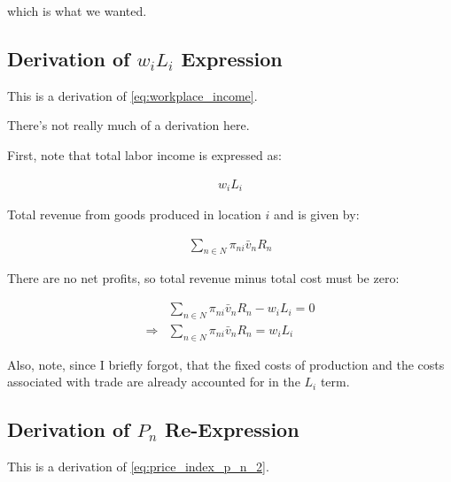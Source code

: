 \documentclass[10pt]{article}
\begin{document}
which is what we wanted.


\subsection{Derivation of $w_i L_i$ Expression}
\label{sec:workplace_income}

This is a derivation of \eqref{eq:workplace_income}.

There's not really much of a derivation here. 

First, note that total labor income is expressed as:

\begin{align}
    w_i L_i
\end{align}

Total revenue from goods produced in location $i$ and is given by:

\begin{align}
    \sum_{n \in N} \pi_{n i} \bar{v}_n R_n
\end{align}

There are no net profits, so 
total revenue minus total cost must be zero:

\begin{align}
    &\sum_{n \in N} \pi_{n i} \bar{v}_n R_n - w_i L_i = 0 \\
    \Rightarrow &\sum_{n \in N} \pi_{n i} \bar{v}_n R_n = w_i L_i
\end{align}

Also, note, since I briefly forgot, that the fixed 
costs of production and the costs associated with 
trade are already accounted for in the $L_i$ term.


\subsection{Derivation of $P_n$ Re-Expression}
\label{sec:price_ni_2}

This is a derivation of \eqref{eq:price_index_p_n_2}.
\end{document}

